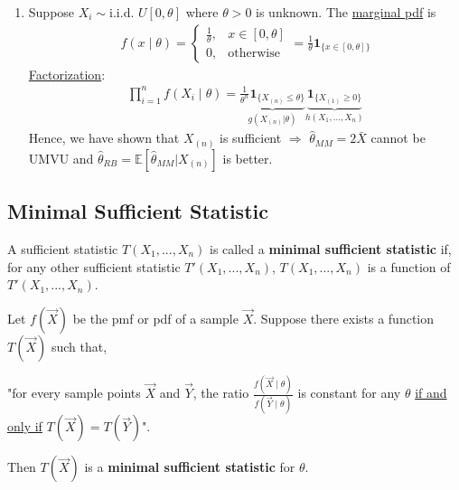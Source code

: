\documentclass[11pt]{elegantbook}
\begin{document}
\begin{example}
\begin{enumerate}
\begin{enumerate}
        \end{enumerate}
        \item Suppose $X_i\sim \text{i.i.d. } U[0,\theta]$ where $\theta>0$ is unknown. The \underline{marginal pdf} is
        \begin{equation}
            \begin{aligned}
                f(x\mid \theta)=\left\{\begin{matrix}
                    \frac{1}{\theta},&x\in[0,\theta]\\
                    0,&\text{otherwise}
                \end{matrix}\right.=\frac{1}{\theta}\mathbf{1}_{\{x\in[0,\theta]\}}
            \end{aligned}
            \nonumber
        \end{equation}
        \underline{Factorization}:
        \begin{equation}
            \begin{aligned}
                \prod_{i=1}^n f(X_i\mid \theta)=\underbrace{\frac{1}{\theta^n}\mathbf{1}_{\{X_{(n)}\leq \theta\}}}_{g(X_{(n)}|\theta)} \underbrace{\mathbf{1}_{\{X_{(1)}\geq 0\}}}_{h(X_1,...,X_n)}
            \end{aligned}
            \nonumber
        \end{equation}
        Hence, we have shown that $X_{(n)}$ is sufficient $\Rightarrow$ $\hat{\theta}_{MM}=2\bar{X}$ cannot be UMVU and $\hat{\theta}_{RB}=\mathbb{E}[\hat{\theta}_{MM}|X_{(n)}]$ is better.
    \end{enumerate}
\end{example}

\subsection{Minimal Sufficient Statistic}
\begin{definition}
    \normalfont
    A sufficient statistic $T(X_1,...,X_n)$ is called a \textbf{minimal sufficient statistic} if, for any other sufficient statistic $T'(X_1,...,X_n)$, $T(X_1,...,X_n)$ is a function of $T'(X_1,...,X_n)$.
\end{definition}

\begin{theorem}
    Let $f(\vec{X})$ be the pmf or pdf of a sample $\vec{X}$. Suppose there exists a function $T(\vec{X})$ such that,
    \begin{center}
        "for every sample points $\vec{X}$ and $\vec{Y}$, the ratio $\frac{f(\vec{X}\mid\theta)}{f(\vec{Y}\mid\theta)}$ is constant for any $\theta$ \underline{if and only if} $T(\vec{X}) = T(\vec{Y})$".
    \end{center}
    Then $T(\vec{X})$ is a \textbf{minimal sufficient statistic} for $\theta$.
\end{theorem}
\end{document}
